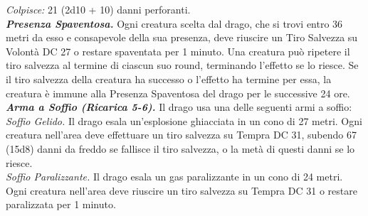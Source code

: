 \begin{multicols}{2}
\emph{Colpisce:} 21 (2d10 + 10) danni perforanti.\\
\emph{\textbf{Presenza Spaventosa.}} Ogni creatura scelta dal drago, che si trovi entro 36 metri da esso e consapevole della sua presenza, deve riuscire un Tiro Salvezza su Volontà DC  27 o restare spaventata per 1 minuto. Una creatura può ripetere il tiro salvezza al termine di ciascun suo round, terminando l'effetto se lo riesce. Se il tiro salvezza della creatura ha successo o l'effetto ha termine per essa, la creatura è immune alla Presenza Spaventosa del drago per le successive 24 ore.\\
\emph{\textbf{Arma a Soffio (Ricarica 5-6).}} Il drago usa una delle seguenti armi a soffio:\\
\emph{Soffio Gelido.} Il drago esala un'esplosione ghiacciata in un cono di 27 metri. Ogni creatura nell'area deve effettuare un tiro salvezza su Tempra DC  31, subendo 67 (15d8) danni da freddo se fallisce il tiro salvezza, o la metà di questi danni se lo riesce.\\
\emph{Soffio Paralizzante.} Il drago esala un gas paralizzante in un cono di 24 metri. Ogni creatura nell'area deve riuscire un tiro salvezza su Tempra DC  31 o restare paralizzata per 1 minuto.\\


\end{multicols}
